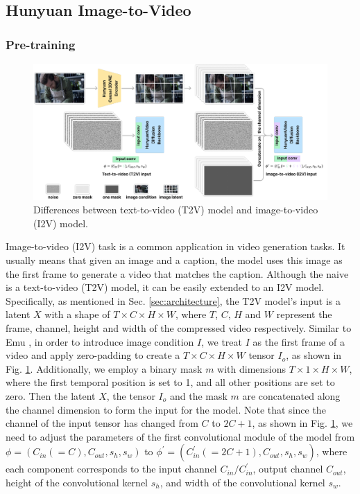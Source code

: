 \subsection{Hunyuan Image-to-Video}
\subsubsection{Pre-training}
\begin{figure}[t]
    \centering
    \includegraphics[width=0.9\linewidth]{figures/I2V.pdf}
    \caption{Differences between text-to-video (T2V) model and image-to-video (I2V) model.}
    \label{fig:i2v}
\end{figure}
Image-to-video (I2V) task is a common application in video generation tasks. It usually means that given an image and a caption, the model uses this image as the first frame to generate a video that matches the caption.
Although the naive \nameofmethod{} is a text-to-video (T2V) model, it can be easily extended to an I2V model.
Specifically, as mentioned in Sec. \ref{sec:architecture}, the T2V model's input is a latent $X$ with a shape of $T \times C \times H \times W$, where $T$, $C$, $H$ and $W$ represent the frame, channel, height and width of the compressed video respectively.
Similar to Emu \cite{girdhar2023emu}, in order to introduce image condition $I$, we treat $I$ as the first frame of a video and apply zero-padding to create a $T \times C \times H \times W$ tensor $I_o$, as shown in Fig. \ref{fig:i2v}.
Additionally, we employ a binary mask $m$ with dimensions $T \times 1 \times H \times W$, where the first temporal position is set to 1, and all other positions are set to zero. Then the latent $X$, the tensor $I_o$ and the mask $m$ are concatenated along the channel dimension to form the input for the model.
Note that since the channel of the input tensor has changed from $C$ to $2C+1$, as shown in Fig. \ref{fig:i2v}, we need to adjust the parameters of the first convolutional module of the model from $\phi=(C_{in}(=C), C_{out}, s_h, s_w)$ to $\phi^{\prime}=(C_{in}^{\prime}(=2C+1), C_{out}, s_h, s_w)$, where each component corresponds to the input channel $C_{in}/C_{in}^{\prime}$, output channel $C_{out}$, height of the convolutional kernel $s_h$, and width of the convolutional kernel $s_w$.
